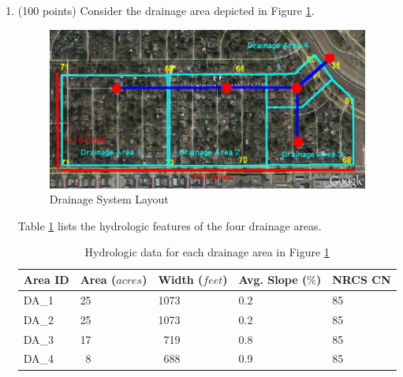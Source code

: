\documentclass[12pt]{article}
\begin{document}
\begin{enumerate}
\clearpage
\item \label{prob:DrainDesign1} (100 points) Consider the drainage area depicted in Figure \ref{fig:Lazybrook}. 

\begin{figure}[ht!] %
\centering
   \includegraphics[width=6in]{lazybrook_drainage.png}
   \caption{Drainage System Layout}
   \label{fig:Lazybrook} 
\end{figure}

Table \ref{tab:drainageareas} lists the hydrologic features of the four drainage areas.
 
\begin{table}[ht!]
      \caption{Hydrologic data for each drainage area in Figure \ref{fig:Lazybrook} \\}
   \begin{tabular}{| p{0.6in} | p{0.9in} | p{0.9in} | p{1.3in} | p{1.3in} |} %
   \hline
   \hline
Area ID & Area ($acres$) & Width ($feet$) & Avg. Slope ($\%$) & NRCS CN \\
\hline
\hline
DA\_1 &  25 & 1073 & 0.2 & 85\\
DA\_2 &  25 & 1073 & 0.2 & 85\\
DA\_3 &  17 & ~719 & 0.8 & 85\\
DA\_4 &  ~8 & ~688 & 0.9 & 85\\
\hline
\hline
   \end{tabular}
   \label{tab:drainageareas}
\end{table}




\end{enumerate}
\end{document}
